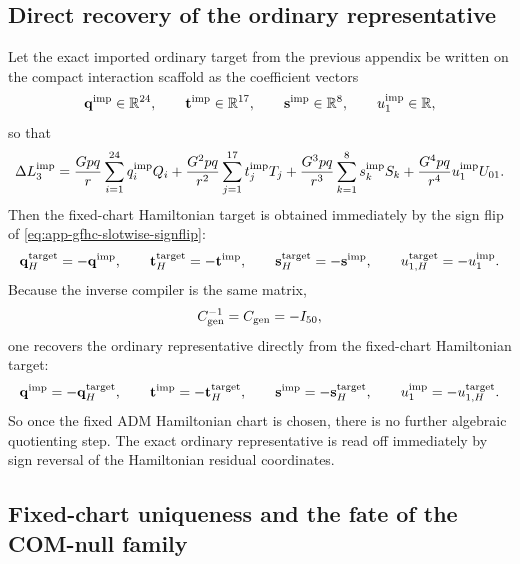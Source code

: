 \documentclass[11pt]{article}
\begin{document}
\subsection{Direct recovery of the ordinary representative}
\label{app:generic-frame-hamiltonian-compiler-uniqueness-recovery}

Let the exact imported ordinary target from the previous appendix be
written on the compact interaction scaffold as the coefficient vectors
\begin{equation}
\mathbf q^{\rm imp}\in\mathbb R^{24},
\qquad
\mathbf t^{\rm imp}\in\mathbb R^{17},
\qquad
\mathbf s^{\rm imp}\in\mathbb R^{8},
\qquad
u_1^{\rm imp}\in\mathbb R,
\label{eq:app-gfhc-imported-vectors}
\end{equation}
so that
\begin{equation}
\Delta L_3^{\rm imp}
=
\frac{Gpq}{r}\sum_{i=1}^{24} q_i^{\rm imp}Q_i
+\frac{G^2pq}{r^2}\sum_{j=1}^{17} t_j^{\rm imp}T_j
+\frac{G^3pq}{r^3}\sum_{k=1}^{8} s_k^{\rm imp}S_k
+\frac{G^4pq}{r^4}u_1^{\rm imp}U_{01}.
\label{eq:app-gfhc-imported-ordinary-target}
\end{equation}
Then the fixed-chart Hamiltonian target is obtained immediately by the sign flip
of \eqref{eq:app-gfhc-slotwise-signflip}:
\begin{equation}
\mathbf q_H^{\rm target}=-\mathbf q^{\rm imp},
\qquad
\mathbf t_H^{\rm target}=-\mathbf t^{\rm imp},
\qquad
\mathbf s_H^{\rm target}=-\mathbf s^{\rm imp},
\qquad
u_{1,H}^{\rm target}=-u_1^{\rm imp}.
\label{eq:app-gfhc-hamiltonian-target-signflip}
\end{equation}
Because the inverse compiler is the same matrix,
\begin{equation}
C_{\rm gen}^{-1}=C_{\rm gen}=-I_{50},
\label{eq:app-gfhc-inverse-compiler}
\end{equation}
one recovers the ordinary representative directly from the fixed-chart
Hamiltonian target:
\begin{equation}
\mathbf q^{\rm imp}=-\mathbf q_H^{\rm target},
\qquad
\mathbf t^{\rm imp}=-\mathbf t_H^{\rm target},
\qquad
\mathbf s^{\rm imp}=-\mathbf s_H^{\rm target},
\qquad
u_1^{\rm imp}=-u_{1,H}^{\rm target}.
\label{eq:app-gfhc-ordinary-recovery}
\end{equation}
So once the fixed ADM Hamiltonian chart is chosen, there is no further algebraic
quotienting step.  The exact ordinary representative is read off immediately by
sign reversal of the Hamiltonian residual coordinates.

\subsection{Fixed-chart uniqueness and the fate of the COM-null family}
\label{app:generic-frame-hamiltonian-compiler-uniqueness-fixed-chart}
\end{document}
